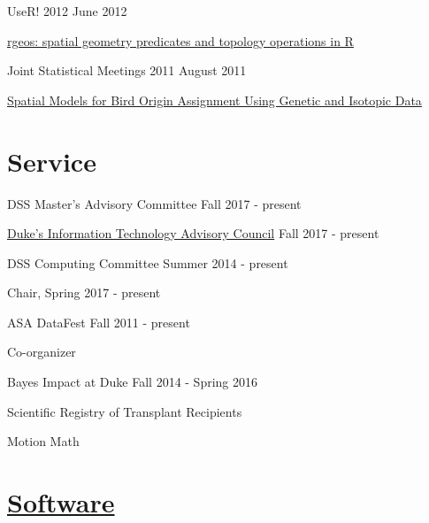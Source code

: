 \documentclass[margin,line]{res}
\begin{document}
\begin{resume}
UseR! 2012 \hfill June 2012
\begin{list1}
\item[] \href{https://github.com/rundel/Presentations/tree/master/UseR2012}{rgeos: spatial geometry predicates and topology operations in R}
\end{list1}
\vspace{-2mm}

Joint Statistical Meetings 2011 \hfill August 2011
\begin{list1}
\item[] \href{https://github.com/rundel/Presentations/tree/master/JSM%202011}{Spatial Models for Bird Origin Assignment Using Genetic and Isotopic Data}
\end{list1}
\vspace{-2mm}

\vspace{4mm}

\section{\sc Service}

DSS Master's Advisory Committee \hfill Fall 2017 - present

\href{http://services.duke.edu/itac/}{Duke's Information Technology Advisory Council} \hfill Fall 2017 - present

DSS Computing Committee \hfill Summer 2014 - present
\begin{list1}
\item[] Chair, Spring 2017 - present
\end{list1}

ASA DataFest \hfill Fall 2011 - present
\begin{list1}
\item[] Co-organizer
\end{list1}


Bayes Impact at Duke \hfill Fall 2014 - Spring 2016
\begin{list1}
\item[] Scientific Registry of Transplant Recipients
\item[] Motion Math
\end{list1}


\vspace{4mm}

\section{\sc \href{https://github.com/rundel/}{Software}}


\end{resume}
\end{document}
